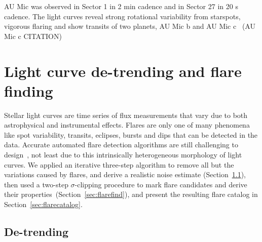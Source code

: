 \documentclass[fleqn,usenatbib,letters]{mnras}%
\begin{document}
AU Mic was observed in Sector 1 in 2 min cadence and in Sector 27 in 20 s cadence. The light curves reveal strong rotational variability from starspots, vigorous flaring and show transits of two planets, AU Mic b and AU Mic c~\citep{plavchan2020} (AU Mic c CITATION)


\section{Light curve de-trending and flare finding}
\label{sec:detrendfind}
Stellar light curves are time series of flux measurements that vary due to both astrophysical and instrumental effects. Flares are only one of many phenomena like spot variability, transits, eclipses, bursts and dips that can be detected in the data. Accurate automated flare detection algorithms are still challenging to design~\citep{vida2021}, not least due to this intrinsically heterogeneous morphology of light curves. We applied an iterative three-step algorithm to remove all but the variations caused by flares, and derive a realistic noise estimate (Section~\ref{sec:detrend}), then used a two-step $\sigma$-clipping procedure to mark flare candidates and derive their properties~(Section~\ref{sec:flarefind}), and present the resulting flare catalog in Section~\ref{sec:flarecatalog}.

\subsection{De-trending}
\label{sec:detrend}

\end{document}
